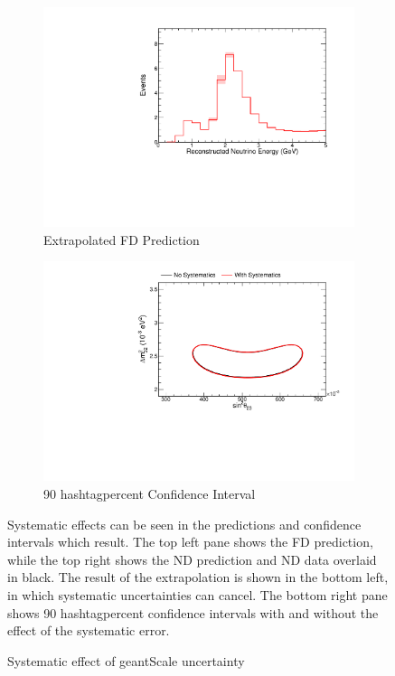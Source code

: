 {\begin{figure}
\begin{center}
\begin{subfigure}[c]{0.49\textwidth}
\includegraphics[width=\textwidth]{figures/systs/prediction/fd_extrap_prediction_geantScale.pdf}
\caption*{Extrapolated FD Prediction}
\end{subfigure}
\begin{subfigure}[c]{0.49\textwidth}
\includegraphics[width=\textwidth]{figures/systs/prediction/fd_extrap_contour_geantScale.pdf}
\caption*{90 hashtagpercent Confidence Interval}
\end{subfigure}
\end{center}
\caption{Systematic effect of geantScale uncertainty}{
Systematic effects can be seen in the predictions and confidence intervals
which result.
The top left pane shows the FD prediction, while the top right shows the
ND prediction and ND data overlaid in black.
The result of the extrapolation is shown in the bottom left, in which
systematic uncertainties can cancel.
The bottom right pane shows 90 hashtagpercent confidence intervals with and without
the effect of the systematic error.}
\label{syst_fig_geantScale}


\end{figure}}
